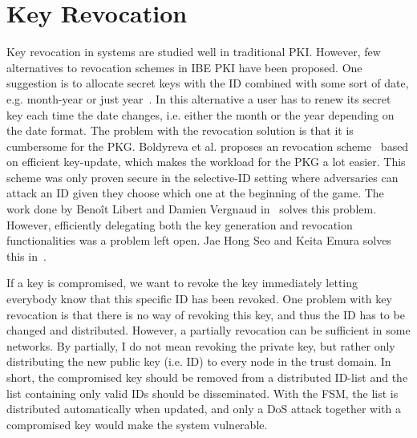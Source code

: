 
\section{Key Revocation}
Key revocation in systems are studied well in traditional \gls{PKI}.
However, few alternatives to revocation schemes in \gls{IBE} \gls{PKI} have been proposed.
One suggestion is to allocate secret keys with the \gls{ID} combined with some sort of date, e.g. month-year or just year~\cite[section 1.1.1]{DBLP:conf/crypto/BonehF01}. 
In this alternative a user has to renew its secret key each time the date changes, i.e. either the month or the year depending on the date format.
The problem with the revocation solution is that it is cumbersome for the \gls{PKG}.
Boldyreva et al. proposes an revocation scheme~\cite{DBLP:journals/iacr/BoldyrevaGK12} based on efficient key-update, which makes the workload for the \gls{PKG} a lot easier. 
This scheme was only proven secure in the selective-ID setting where adversaries can attack an \gls{ID} given they choose which one at the beginning of the game.
The work done by Beno\^{i}t Libert and Damien Vergnaud in~\cite{DBLP:conf/ctrsa/LibertV09} solves this problem. 
However, efficiently delegating both the key generation and revocation functionalities was a problem left open.
Jae Hong Seo and Keita Emura solves this in~\cite{DBLP:journals/iacr/SeoE13a}.

If a key is compromised, we want to revoke the key immediately letting everybody know that this specific \gls{ID} has been revoked. 
One problem with key revocation is that there is no way of revoking this key, and thus the \gls{ID} has to be changed and distributed. 
However, a partially revocation can be sufficient in some networks. 
By partially, I do not mean revoking the private key, but rather only distributing the new public key (i.e. \gls{ID}) to every node in the trust domain.
In short, the compromised key should be removed from a distributed ID-list and the list containing only valid \gls{ID}s should be disseminated.
With the \gls{FSM}, the list is distributed automatically when updated, and only a \gls{DoS} attack together with a compromised key would make the system vulnerable. 
